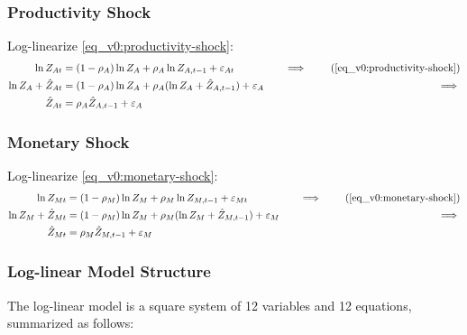 \documentclass[
thesis.tex
]{subfiles}
\begin{document}
	
	\subsubsection*{Productivity Shock}
	
	Log-linearize \ref{eq_v0:productivity-shock}:
	\begin{alignat}{2}
		\ln{Z_{At}} &= (1-\rho_A)\ln{Z_A} + \rho_A\ln{Z_{A,t-1}} + \varepsilon_{At} &\implies \tag{\ref{eq_v0:productivity-shock}} \\
		\ln{Z_{A}} + \hat{Z}_{At} &= (1-\rho_A) \ln{Z_A} + \rho_A (\ln{Z_{A}} + \hat{Z}_{A,t-1}) + \varepsilon_{A} \quad &\implies \nonumber \\
		\hat{Z}_{At} &= \rho_A \hat{Z}_{A,t-1} + \varepsilon_{A} \label{eq_v0:ll-productivity-shock}
	\end{alignat}
	
	
	\subsubsection*{Monetary Shock}
	
	Log-linearize \ref{eq_v0:monetary-shock}:
	\begin{alignat}{2}
		\ln{Z_{Mt}} &= (1-\rho_M)\ln{Z_M} + \rho_M\ln{Z_{M,t-1}} + \varepsilon_{Mt} &\implies \tag{\ref{eq_v0:monetary-shock}} \\
		\ln{Z_{M}} + \hat{Z}_{Mt} &= (1-\rho_M) \ln{Z_M} + \rho_M (\ln{Z_{M}} + \hat{Z}_{M,t-1}) + \varepsilon_{M} \quad &\implies \nonumber \\
		\hat{Z}_{Mt} &= \rho_M \hat{Z}_{M,t-1} + \varepsilon_{M} \label{eq_v0:ll-monetary-shock}
	\end{alignat}
	
	
	
	\subsubsection{Log-linear Model Structure}
	
	The log-linear model is a square system of 12 variables and 12 equations, summarized as follows:
	
\end{document}
